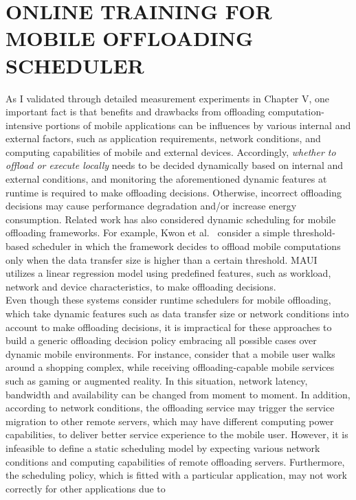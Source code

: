 \chapter{ONLINE TRAINING FOR MOBILE OFFLOADING SCHEDULER}
\label{chap:online}
As I validated through detailed measurement experiments in Chapter V,
one important fact is that benefits and drawbacks from offloading
computation-intensive portions of mobile applications can be influences
by various internal and external factors, such as application
requirements, network conditions, and computing capabilities of mobile
and external devices.
%
Accordingly, \textit{whether to offload or execute locally} needs to be
decided dynamically based on internal and external conditions, and
monitoring the aforementioned dynamic features at runtime is required to
make offloading decisions.
%
Otherwise, incorrect offloading decisions may cause performance
degradation and/or increase energy consumption.
%
Related work has also considered dynamic scheduling for mobile
offloading frameworks.
%
For example, Kwon et al.~\cite{kwon} consider a simple threshold-based
scheduler in which the framework decides to offload  mobile
computations only when the data transfer size is higher than a certain
threshold.
%
MAUI~\cite{maui} utilizes a linear regression model using predefined
features, such as workload, network and device characteristics, to make
offloading decisions.\\
%
Even though these systems consider runtime schedulers for mobile
offloading, which take dynamic features such as data transfer size or
network conditions into account to make offloading decisions, it is
impractical for these approaches to build a generic offloading decision
policy embracing all possible cases over dynamic mobile environments.
%
For instance, consider that a mobile user walks around a shopping complex, while
receiving offloading-capable mobile services such as gaming or
augmented reality.
%
In this situation, network latency, bandwidth and availability can be changed from
moment to moment.
%
In addition, according to network conditions, the offloading service may
trigger the service migration to other remote servers, which may have
different computing power capabilities, to deliver better service experience
to the mobile user.
%
However, it is infeasible to define a static scheduling model by
expecting various network conditions and computing capabilities of remote
offloading servers.  
%
Furthermore, the scheduling policy, which is fitted with a particular
application, may not work correctly for other applications due to
